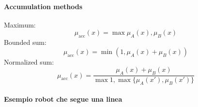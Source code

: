 \paragraph{Accumulation methods}
Maximum: $$\mu_{\text{acc}}(x) = \max{\mu_A(x), \mu_B(x)}$$
Bounded sum: $$\mu_{\text{acc}}(x) = \min(1, \mu_A(x) + \mu_B(x))$$
Normalized sum: $$\mu_{\text{acc}}(x) = \frac{\mu_A(x) + \mu_B(x)}{\max{1, \max{\{\mu_A(x'), \mu_B(x')\}}}}$$

\paragraph{Esempio robot che segue una linea}

